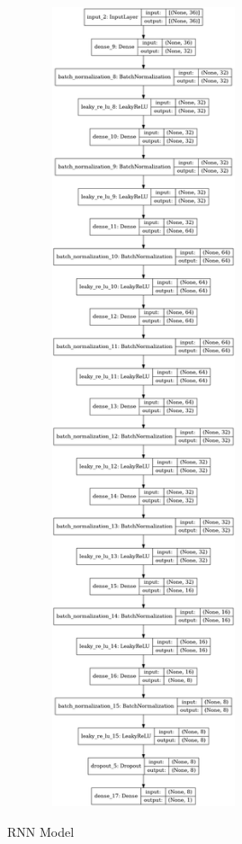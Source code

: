 \documentclass[conference]{IEEEtran}
\begin{document}
\begin{figure}[H]
\includegraphics[width=8cm, height=23.5cm]{M1_Model}
	\label{fig}
	\caption{RNN Model}
\end{figure}
\end{document}
